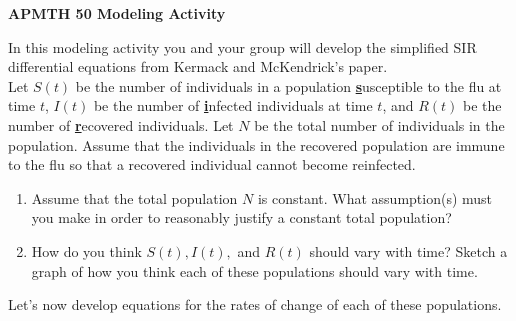 \documentclass[12pt]{article}
\begin{document}
\begin{center}{\Large \bf{APMTH 50 Modeling Activity}}\\
\end{center}


\noindent In this modeling activity you and your group will develop the simplified SIR differential equations from Kermack and McKendrick's paper.  \\

\noindent Let $S(t)$ be the number of individuals in a population \underline{\textbf{s}}usceptible to the flu at time $t$, $I(t)$ be the number of \underline{\textbf{i}}nfected individuals at time $t$, and $R(t)$ be the number of \textbf{\underline{r}}ecovered individuals.  Let $N$ be the total number of individuals in the population.  Assume that the individuals in the recovered population are immune to the flu so that a recovered individual cannot become reinfected.  
\begin{enumerate}
\item Assume that the total population $N$ is constant.  What assumption(s) must you make in order to reasonably justify a constant total population?
\vspace{1in}
\item How do you think $S(t), I(t),$ and $R(t)$  should vary with time?  Sketch a graph of how you think each of these populations should vary with time.
\vspace{2in}
\end{enumerate}
\newpage
 Let's now develop equations for the rates of change of each of these populations.  
\end{document}
